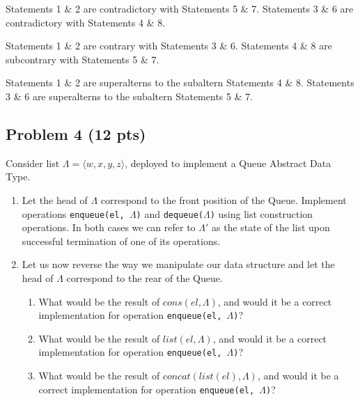 \documentclass[12pt]{article}
\begin{document}
Statements 1 \& 2 are contradictory with Statements 5 \& 7. Statements 3 \& 6 are contradictory with Statements 4 \& 8. 

Statements 1 \& 2 are contrary with Statements 3 \& 6. Statements 4 \& 8 are subcontrary with Statements 5 \& 7.

Statements 1 \& 2 are superalterns to the subaltern Statements 4 \& 8. Statements 3 \& 6 are superalterns to the subaltern Statements 5 \& 7.



\newpage

\subsection{Problem 4 (12 pts)}

Consider list $\Lambda = \langle w, x, y, z \rangle$, deployed to implement a Queue Abstract Data Type.

\begin{enumerate}

\item Let the head of $\Lambda$ correspond to the front position of the Queue. Implement operations \texttt{enqueue(el, $\Lambda$)} and \texttt{dequeue($\Lambda$)} using list construction operations. In both cases we can refer to $\Lambda'$ as the state of the list upon successful termination of one of its operations.

\item Let us now reverse the way we manipulate our data structure and let the head of $\Lambda$ correspond to the rear of the Queue.
\begin{enumerate}
\item What would be the result of $cons(el, \Lambda)$, and would it be a correct implementation for operation \texttt{enqueue(el, $\Lambda$)}?
\item What would be the result of $list(el, \Lambda)$, and would it be a correct implementation for operation \texttt{enqueue(el, $\Lambda$)}?
\item What would be the result of $concat(list(el), \Lambda)$, and would it be a correct implementation for operation \texttt{enqueue(el, $\Lambda$)}?
\end{enumerate}
\end{enumerate}
\end{document}
